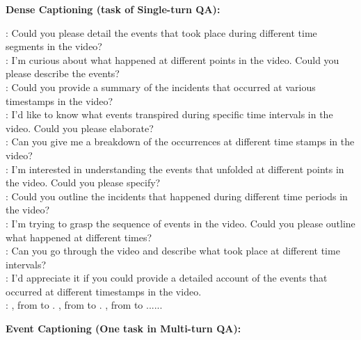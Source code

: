 \documentclass[10pt,twocolumn,letterpaper]{article}
\begin{document}
\begin{figure*}[t] \centering

\begin{tcolorbox}[colback=gray!20, colframe=black, text width=0.9\textwidth, title={Box 3: Templates to transform events  into QA dialogues, 10 templates for each task.}]
\hypertarget{box3}{}

\textbf{Dense Captioning (task of Single-turn QA):}

: Could you please detail the events that took place during different time segments in the video? \\ 
: I'm curious about what happened at different points in the video. Could you please describe the events? \\ 
: Could you provide a summary of the incidents that occurred at various timestamps in the video? \\ 
: I'd like to know what events transpired during specific time intervals in the video. Could you please elaborate? \\ 
: Can you give me a breakdown of the occurrences at different time stamps in the video? \\ 
: I'm interested in understanding the events that unfolded at different points in the video. Could you please specify? \\ 
: Could you outline the incidents that happened during different time periods in the video? \\ 
: I'm trying to grasp the sequence of events in the video. Could you please outline what happened at different times? \\ 
: Can you go through the video and describe what took place at different time intervals? \\ 
: I'd appreciate it if you could provide a detailed account of the events that occurred at different timestamps in the video. \\
: \textcolor{blue}{}, from \textcolor{blue}{} to \textcolor{blue}{}. \textcolor{blue}{}, from \textcolor{blue}{} to \textcolor{blue}{}. \textcolor{blue}{}, from \textcolor{blue}{} to \textcolor{blue}{}...... \\

\tcblower

\textbf{Event Captioning (One task in Multi-turn QA):}


\end{tcolorbox}
\end{figure*}
\end{document}
